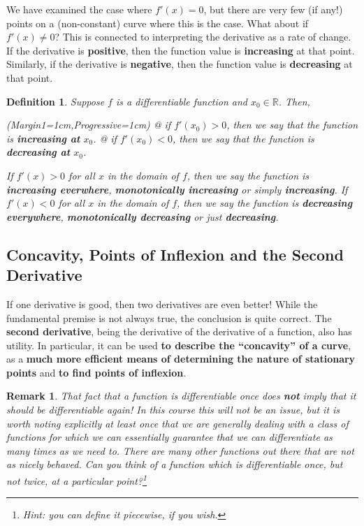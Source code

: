 \documentclass[a4paper,11pt]{article}
\newcommand{\R}{\mathbb{R}}
\newtheorem*{definition*}{Definition}
\newtheorem*{remark}{Remark}
\begin{document}
\noindent We have examined the case where $f'(x)=0$, but there are very few (if any!) points on a (non-constant) curve where this is the case. What about if $f'(x)\neq0$? This is connected to interpreting the derivative as a rate of change. If the derivative is \textbf{positive}, then the function value is \textbf{increasing} at that point. Similarly, if the derivative is \textbf{negative}, then the function value is \textbf{decreasing} at that point.

\begin{definition*}
	Suppose $f$ is a differentiable function and $x_0\in\R$. Then,
	\vspace{0.15cm}
	\begin{easylist}[itemize]
		\ListProperties(Margin1=1cm,Progressive=1cm)
		@ if $f'(x_0)>0$, then we say that the function is \textbf{increasing at} $x_0$.
		@ if $f'(x_0)<0$, then we say that the function is \textbf{decreasing at} $x_0$.
	\end{easylist}
	\vspace{0.15cm}
	\noindent If $f'(x)>0$ for all $x$ in the domain of $f$, then we say the function is \textbf{increasing everwhere}, \textbf{monotonically increasing} or simply \textbf{increasing}. If $f'(x)<0$ for all $x$ in the domain of $f$, then we say the function is \textbf{decreasing everywhere}, \textbf{monotonically decreasing} or just \textbf{decreasing}.
\end{definition*}
\pagebreak

\subsection{Concavity, Points of Inflexion and the Second Derivative}
If one derivative is good, then two derivatives are even better! While the fundamental premise is not always true, the conclusion is quite correct. The \textbf{second derivative}, being the derivative of the derivative of a function, also has utility. In particular, it can be used \textbf{to describe the ``concavity'' of a curve}, as a \textbf{much more efficient means of determining the nature of stationary points} and \textbf{to find points of inflexion}.

\begin{remark}
	\normalfont
	That fact that a function is differentiable once does \textbf{not} imply that it should be differentiable again! In this course this will not be an issue, but it is worth noting explicitly at least once that we are generally dealing with a class of functions for which we can essentially guarantee that we can differentiate as many times as we need to. There are many other functions out there that are not as nicely behaved. Can you think of a function which is differentiable once, but not twice, at a particular point?\footnote{Hint: you can define it piecewise, if you wish.}
\end{remark}
\end{document}
